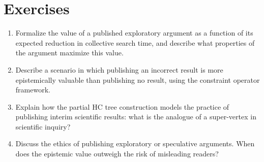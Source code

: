 \section{Exercises}

\begin{enumerate}
  \item Formalize the value of a published exploratory argument as a function of its expected reduction in collective search time, and describe what properties of the argument maximize this value.
  \item Describe a scenario in which publishing an incorrect result is more epistemically valuable than publishing no result, using the constraint operator framework.
  \item Explain how the partial HC tree construction models the practice of publishing interim scientific results: what is the analogue of a super-vertex in scientific inquiry?
  \item Discuss the ethics of publishing exploratory or speculative arguments. When does the epistemic value outweigh the risk of misleading readers?
\end{enumerate}

